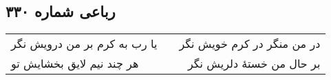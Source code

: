 \begin{center}
\section*{رباعی شماره ۳۳۰}
\label{sec:sh330}
\begin{longtable}{l p{0.5cm} r}
یا رب به کرم بر من درویش نگر
&&
در من منگر در کرم خویش نگر
\\
هر چند نیم لایق بخشایش تو
&&
بر حال من خستهٔ دلریش نگر
\\
\end{longtable}
\end{center}

